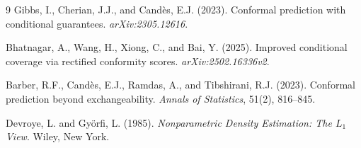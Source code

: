\documentclass[11pt]{article}
\theoremstyle{remark}
\begin{document}
\begin{thebibliography}{9}
  Gibbs, I., Cherian, J.J., and Cand\`{e}s, E.J. (2023).
  Conformal prediction with conditional guarantees.
  \emph{arXiv:2305.12616}.

  Bhatnagar, A., Wang, H., Xiong, C., and Bai, Y. (2025).
  Improved conditional coverage via rectified conformity scores.
  \emph{arXiv:2502.16336v2}.

  Barber, R.F., Cand\`{e}s, E.J., Ramdas, A., and Tibshirani, R.J. (2023).
  Conformal prediction beyond exchangeability.
  \emph{Annals of Statistics}, 51(2), 816--845.

  Devroye, L. and Gy\"{o}rfi, L. (1985).
  \emph{Nonparametric Density Estimation: The $L_1$ View}.
  Wiley, New York.
\end{thebibliography}
\end{document}
